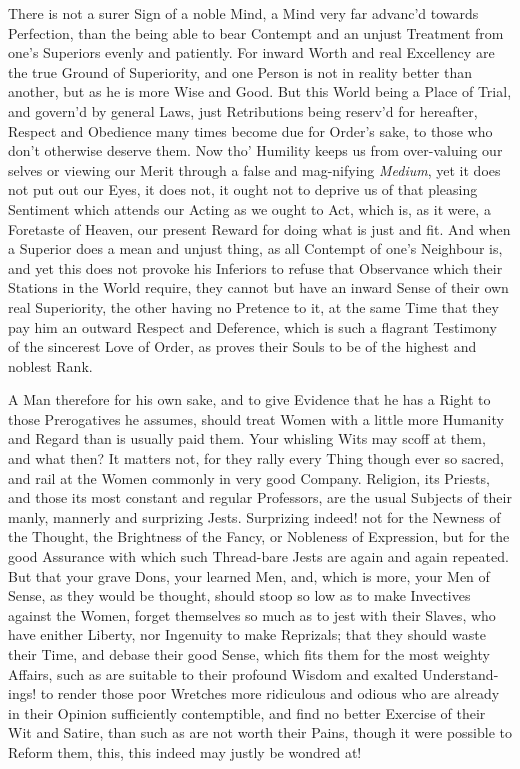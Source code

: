 There is not a surer Sign of a noble Mind, a Mind very far advanc'd
towards Perfection, than the being able to bear Contempt and an unjust
Treatment from one's Superiors evenly and patiently. For inward Worth
and real Excellency are the true Ground of Superiority, and one Person
is not in reality better than another, but as he is more Wise and
Good. But this World being a Place of Trial, and govern'd by general
Laws, just Retributions being reserv'd for hereafter, Respect and
Obedience many times become due for Order's sake, to those who don't
otherwise deserve them. Now tho' Humility keeps us from over-valuing
our selves or viewing our Merit through a false and
mag-nifying \textit{Medium}, yet it does not put out our
Eyes, it does not, it ought not to deprive us of that pleasing
Sentiment which attends our Acting as we ought to Act, which is, as it
were, a Foretaste of Heaven, our present Reward for doing what is just
and fit. And when a Superior does a mean and unjust thing, as all
Contempt of one's Neighbour is, and yet this does not provoke his
Inferiors to refuse that Observance which their Stations in the World
require, they cannot but have an inward Sense of their own real
Superiority, the other having no Pretence to it, at the same Time that
they pay him an outward Respect and Deference, which is such a
flagrant Testimony of the sincerest Love of Order, as proves their
Souls to be of the highest and noblest Rank.

A Man therefore for his own sake, and to give Evidence that he has a
Right to those Prerogatives he assumes, should treat Women with a
little more Humanity and Regard than is usually paid  them.
Your whisling Wits may scoff at them, and what then? It matters not,
for they rally every Thing though ever so sacred, and rail at the
Women commonly in very good Company. Religion, its Priests, and those
its most constant and regular Professors, are the usual Subjects of
their manly, mannerly and surprizing Jests. Surprizing indeed! not for
the Newness of the Thought, the Brightness of the Fancy, or Nobleness
of Expression, but for the good Assurance with which such Thread-bare
Jests are again and again repeated. But that your grave Dons, your
learned Men, and, which is more, your Men of Sense, as they would be
thought, should stoop so low as to make Invectives against the Women,
forget themselves so much as to jest with their Slaves, who have
enither Liberty, nor Ingenuity to make Reprizals; that they should
waste their Time, and debase their good Sense, which fits them for the
most weighty Affairs, such as are suitable to their profound Wisdom and
exalted Understand-ings! to render those poor Wretches more
ridiculous and odious who are already in their Opinion sufficiently
contemptible, and find no better Exercise of their Wit and Satire,
than such as are not worth their Pains, though it were possible to
Reform them, this, this indeed may justly be wondred at!

